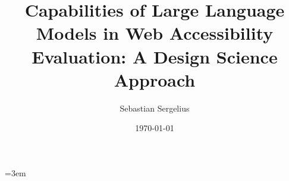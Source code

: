 \documentclass[english,twoside,censored,csm,software-track-2020]{HYthesisML}
\title{Capabilities of Large Language Models in Web Accessibility Evaluation: A Design Science Approach}
\author{Sebastian Sergelius}
\date{\today}
\begin{document}
\maketitle



\mytableofcontents

\mainmatter









\emergencystretch=3em
\printbibliography

\backmatter
\begin{appendices}

\end{appendices}
\end{document}
